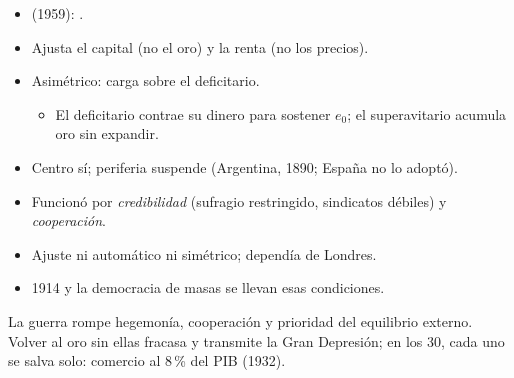 \documentclass{article}
\begin{document}
\begin{columnas}
\begin{itemize}
\end{itemize}
\begin{itemize}
\item {} (1959): .
\item Ajusta el capital (no el oro) y la renta (no los precios).
\item Asimétrico: carga sobre el deficitario.
  \begin{itemize}
  \item El deficitario contrae su dinero para sostener $e_0$; el superavitario acumula oro sin expandir.
  \end{itemize}
\item Centro sí; periferia suspende (Argentina, 1890; España no lo adoptó).
\end{itemize}
\begin{itemize}
\item Funcionó por \emph{credibilidad} (sufragio restringido, sindicatos débiles) y \emph{cooperación}.
\item Ajuste ni automático ni simétrico; dependía de Londres.
\item 1914 y la democracia de masas se llevan esas condiciones.
\end{itemize}

\begin{ideaclave}
La guerra rompe hegemonía, cooperación y prioridad del equilibrio externo. Volver al oro sin ellas fracasa y transmite la Gran Depresión; en los 30, cada uno se salva solo: comercio al 8\,\% del PIB (1932).
\end{ideaclave}


\end{columnas}
\end{document}

